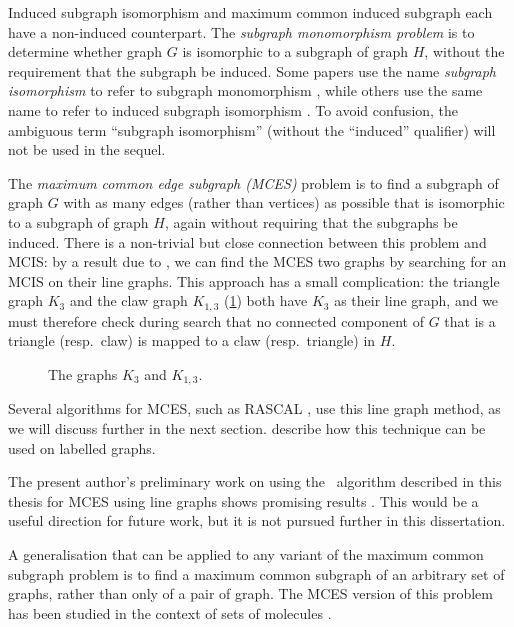 Induced subgraph isomorphism and maximum common induced subgraph each have a
non-induced counterpart. The \emph{subgraph monomorphism problem} is to
determine whether graph $G$ is isomorphic to a subgraph of graph $H$, without
the requirement that the subgraph be induced.  Some papers use the name
\emph{subgraph isomorphism} to refer to subgraph monomorphism
\citep{DBLP:conf/cp/McCreeshP15}, while others use the same name to refer to induced
subgraph isomorphism \citep{DBLP:journals/pami/CarlettiFSV18}.  To avoid
confusion, the ambiguous term ``subgraph isomorphism'' (without the ``induced''
qualifier) will not be used in the sequel.

The \emph{maximum common edge subgraph (MCES)} problem is to find a subgraph of
graph $G$ with as many edges (rather than vertices) as possible that is
isomorphic to a subgraph of graph $H$, again without requiring that the
subgraphs be induced.  There is a non-trivial but close connection between this
problem and MCIS: by a result due to \citet{whitney1932congruent}, we can find
the MCES two graphs by searching for an MCIS on their line graphs.  This
approach has a small complication: the triangle graph $K_3$ and the claw graph
$K_{1,3}$ (\cref{fig:k3-and-claw}) both have $K_3$ as their line graph, and we
must therefore check during search that no  connected component of $G$
that is a triangle (resp.\ claw) is mapped to a claw (resp.\ triangle) in $H$.

\begin{figure}[htb]
    \centering
    
    \caption{The graphs $K_3$ and $K_{1,3}$.}
    \label{fig:k3-and-claw}
\end{figure}

Several algorithms for MCES, such as RASCAL
\citep{DBLP:journals/cj/RaymondGW02}, use this line graph method, as we will discuss further
in the next section.  \citet{DBLP:conf/mco/VismaraV08} describe how this technique
can be used on labelled graphs.

The present author's preliminary work on using the \McSplit\ algorithm
described in this thesis for MCES using line graphs shows promising results
\citep{trimble2018three}. This would be a useful direction for future work, but
it is not pursued further in this dissertation.

A generalisation that can be applied to any variant of the maximum common subgraph
problem is to find a maximum common subgraph of an arbitrary set of graphs,
rather than only of a pair of graph.  The MCES version of this problem has
been studied in the context of sets of molecules
\citep{DBLP:journals/jcheminf/DalkeH13}.

